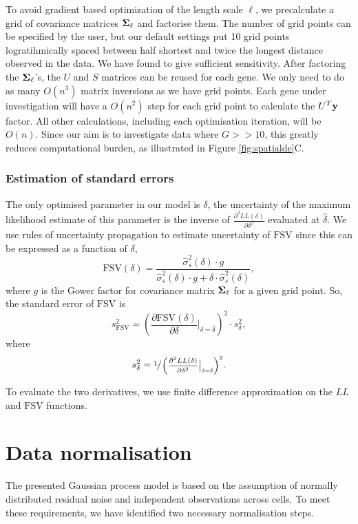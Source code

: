 To avoid gradient based optimization of the length scale \( \ell \), we precalculate a grid of covariance matrices \( \mbox{\boldmath $\Sigma$}_\ell \) and factorise them. The number of grid points can be specified by the user, but our default settings put 10 grid points logratihmically spaced between half shortest and twice the longest distance observed in the data. We have found to give sufficient sensitivity. After factoring the \( \mbox{\boldmath $\Sigma$}_\ell \)'s, the \( U \) and \( S \) matrices can be reused for each gene. We only need to do as many \( O(n^3) \) matrix inversions as we have grid points. Each gene under investigation will have a \( O(n^2) \) step for each grid point to calculate the \( U^T{\bf y} \) factor. All other calculations, including each optimisation iteration, will be \( O(n) \). Since our aim is to investigate data where \( G >> 10 \), this greatly reduces computational burden, as illustrated in Figure \ref{fig:spatialde}C.

\subsubsection*{Estimation of standard errors}

The only optimised parameter in our model is \( \delta \), the uncertainty of the maximum likelihood estimate of this parameter is the inverse of \( \frac{\partial^2 LL(\delta)}{\partial \delta^2} \) evaluated at \( \hat{\delta} \). We use rules of uncertainty propagation to estimate uncertainty of \( \text{FSV} \) since this can be expressed as a function of \( \delta \),
\[
\text{FSV}(\delta) = \frac{\hat{\sigma}^2_s(\delta) \cdot g}{\hat{\sigma}^2_s(\delta) \cdot g + \delta \cdot \hat{\sigma}^2_s(\delta)},
\]
where \( g \) is the Gower factor for covariance matrix \( \mbox{\boldmath $\Sigma$}_\ell \) for a given grid point. So, the standard error of \( \text{FSV} \) is
\[
s_{\text{FSV}}^2 = \left(\frac{\partial \text{FSV}(\delta)}{\partial \delta} \Bigr|_{\delta = \hat{\delta}}\right)^2 \cdot s_\delta^2,
\]
where
\[
s^2_\delta = \sfrac{1}{\left(\frac{\partial^2 LL(\delta)}{\partial \delta^2} \Bigr|_{\delta = \hat{\delta}}\right)^2}.
\]

To evaluate the two derivatives, we use finite difference approximation on the \( LL \) and \( \text{FSV} \) functions.

\section{Data normalisation}

The presented Gaussian process model is based on the assumption of normally distributed residual noise and independent observations across cells. To meet these requirements, we have identified two necessary normalisation steps.

